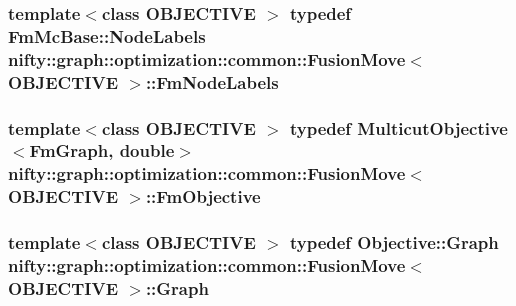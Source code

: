 \subsubsection[{Fm\+Node\+Labels}]{\setlength{\rightskip}{0pt plus 5cm}template$<$class O\+B\+J\+E\+C\+T\+I\+V\+E $>$ typedef Fm\+Mc\+Base\+::\+Node\+Labels {\bf nifty\+::graph\+::optimization\+::common\+::\+Fusion\+Move}$<$ O\+B\+J\+E\+C\+T\+I\+V\+E $>$\+::{\bf Fm\+Node\+Labels}}\label{classnifty_1_1graph_1_1optimization_1_1common_1_1FusionMove_a6a9b4fbe94395033bb21da945f181d71}
\hypertarget{classnifty_1_1graph_1_1optimization_1_1common_1_1FusionMove_a608f76fd662b686f32396b5a252b2f98}{}
\subsubsection[{Fm\+Objective}]{\setlength{\rightskip}{0pt plus 5cm}template$<$class O\+B\+J\+E\+C\+T\+I\+V\+E $>$ typedef Multicut\+Objective$<${\bf Fm\+Graph}, double$>$ {\bf nifty\+::graph\+::optimization\+::common\+::\+Fusion\+Move}$<$ O\+B\+J\+E\+C\+T\+I\+V\+E $>$\+::{\bf Fm\+Objective}}\label{classnifty_1_1graph_1_1optimization_1_1common_1_1FusionMove_a608f76fd662b686f32396b5a252b2f98}
\hypertarget{classnifty_1_1graph_1_1optimization_1_1common_1_1FusionMove_a846b143ce9fbf252bf6c7771dc1b52b9}{}
\subsubsection[{Graph}]{\setlength{\rightskip}{0pt plus 5cm}template$<$class O\+B\+J\+E\+C\+T\+I\+V\+E $>$ typedef Objective\+::\+Graph {\bf nifty\+::graph\+::optimization\+::common\+::\+Fusion\+Move}$<$ O\+B\+J\+E\+C\+T\+I\+V\+E $>$\+::{\bf Graph}}\label{classnifty_1_1graph_1_1optimization_1_1common_1_1FusionMove_a846b143ce9fbf252bf6c7771dc1b52b9}
\hypertarget{classnifty_1_1graph_1_1optimization_1_1common_1_1FusionMove_acf0358608c8cd6f9506b50a850584751}{}
